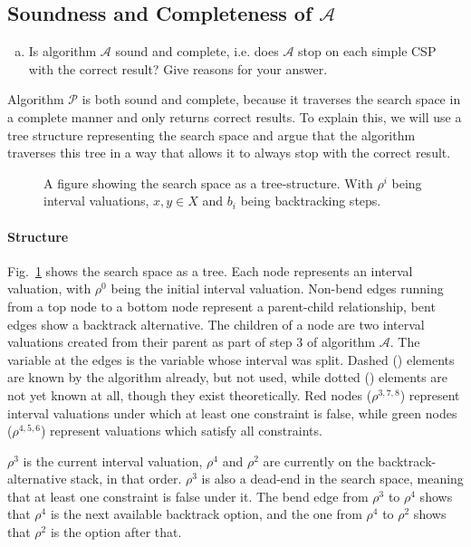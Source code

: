 \subsection{Soundness and Completeness of $\mathcal{A}$}
\begin{enumerate}[(b)]
\item Is algorithm $\mathcal{A}$ sound and complete, i.e. does $\mathcal{A}$ stop on each simple CSP with the correct result? Give reasons for your answer.
\end{enumerate}

Algorithm $\mathcal{P}$ is both sound and complete, because it traverses the search space in a complete manner and only returns correct results.
To explain this, we will use a tree structure representing the search space and argue that the algorithm traverses this tree in a way that allows it to always stop with the correct result.

\begin{figure}[H]
    \centering
    
    \caption{
        A figure showing the search space as a tree-structure.
        With $\rho^i$ being interval valuations, $x, y \in X$ and $b_i$ being backtracking steps.
    }
    \label{fig:search-tree}
\end{figure}


\paragraph{Structure}
Fig.~\ref{fig:search-tree} shows the search space as a tree.
Each node represents an interval valuation, with $\rho^0$ being the initial interval valuation.
Non-bend edges running from a top node to a bottom node represent a parent-child relationship, bent edges show a backtrack alternative.
The children of a node are two interval valuations created from their parent as part of step 3 of algorithm $\mathcal{A}$.
The variable at the edges is the variable whose interval was split.
Dashed (\dashed) elements are known by the algorithm already, but not used, while dotted (\dotted) elements are not yet known at all, though they exist theoretically.
Red nodes ($\rho^{3,7,8}$) represent interval valuations under which at least one constraint is false, while green nodes ($\rho^{4,5,6}$) represent valuations which satisfy all constraints.

$\rho^3$ is the current interval valuation, $\rho^4$ and $\rho^2$ are currently on the backtrack-alternative stack, in that order.
$\rho^3$ is also a dead-end in the search space, meaning that at least one constraint is false under it.
The bend edge from $\rho^3$ to $\rho^4$ shows that $\rho^4$ is the next available backtrack option, and the one from $\rho^4$ to $\rho^2$ shows that $\rho^2$ is the option after that.

